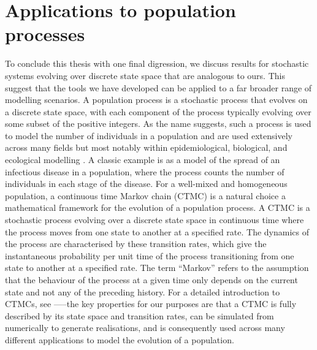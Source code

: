 \section{Applications to population processes}\label{sec:epi_disc}
To conclude this thesis with one final digression, we discuss results for stochastic systems evolving over discrete state space that are analogous to ours.
This suggest that the tools we have developed can be applied to a far broader range of modelling scenarios.
A population process is a stochastic process that evolves on a discrete state space, with each component of the process typically evolving over some subset of the positive integers.
As the name suggests, such a process is used to model the number of individuals in a population \citep{Kendall_1949_StochasticProcessesPopulation} and are used extensively across many fields but most notably within epidemiological, biological, and ecological modelling \citep{Brauer_2008_CompartmentalModelsEpidemiology}.
A classic example is as a model of the spread of an infectious disease in a population, where the process counts the number of individuals in each stage of the disease.
For a well-mixed and homogeneous population, a continuous time Markov chain (CTMC) is a natural choice a mathematical framework for the evolution of a population process.
A CTMC is a stochastic process evolving over a discrete state space in continuous time where the process moves from one state to another at a specified rate.
The dynamics of the process are characterised by these transition rates, which give the instantaneous probability per unit time of the process transitioning from one state to another at a specified rate.
The term ``Markov'' refers to the assumption that the behaviour of the process at a given time only depends on the current state and not any of the preceding history.
For a detailed introduction to CTMCs, see \citet{Anderson_1991_ContinuousTimeMarkovChains}—--the key properties for our purposes are that a CTMC is fully described by its state space and transition rates, can be simulated from numerically to generate realisations, and is consequently used across many different applications to model the evolution of a population.


